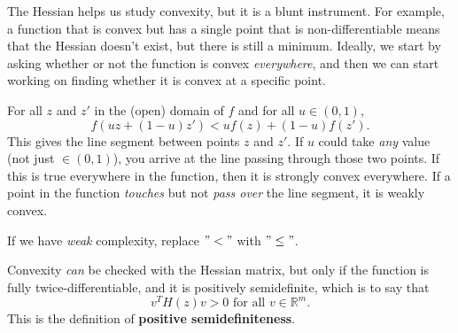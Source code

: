 \documentclass[titlepage, 12pt, leqno]{article}
\begin{document}
The Hessian helps us study convexity, but it is a blunt instrument. For example,
a function that is convex but has a single point that is non-differentiable 
means that the Hessian doesn't exist, but there is still a minimum. Ideally, we
start by asking whether or not the function is convex \textit{everywhere}, and
then we can start working on finding whether it is convex at a specific point.

For all $z$ and $z'$ in the (open) domain of $f$ and for all $u \in (0,1)$,
\[
    f(uz + (1-u)z') < uf(z) + (1-u)f(z').
\]
This gives the line segment between points $z$ and $z'$. If $u$ could take 
\textit{any} value (not just $\in (0,1)$), you arrive at the line passing through
those two points. If this is true everywhere in the function, then it is
strongly convex everywhere. If a point in the function \textit{touches} but not
\textit{pass over} the line segment, it is weakly convex.

\begin{note}
    If we have \textit{weak} complexity, replace $"<"$ with $"\le"$.
\end{note}

Convexity \textit{can} be checked with the Hessian matrix, but only if the
function is fully twice-differentiable, and it is positively semidefinite, which
is to say that
\[
    v^{T}H(z)v > 0 \text{ for all } v \in \mathbb{R}^{m}.
\]
This is the definition of \textbf{positive semidefiniteness}.
\end{document}
